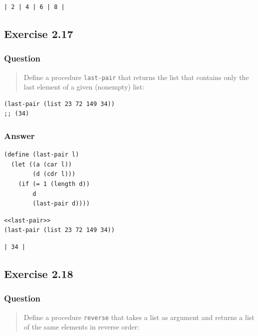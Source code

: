 \documentclass[final,fleqn,titlepage,twoside]{article}
\begin{document}
\begin{verbatim}
| 2 | 4 | 6 | 8 |
\end{verbatim}

\subsection{Exercise 2.17}
\label{sec:org093b910}
\subsubsection{Question}
\label{sec:org63b839a}
\begin{quote}
Define a procedure
\texttt{last-pair} that returns the list that contains only the last element of a
given (nonempty) list:
\end{quote}

\begin{verbatim}
(last-pair (list 23 72 149 34))
;; (34)
\end{verbatim}

\subsubsection{Answer}
\label{sec:org8aef1be}
\begin{verbatim}
(define (last-pair l)
  (let ((a (car l))
        (d (cdr l)))
    (if (= 1 (length d))
        d
        (last-pair d))))
\end{verbatim}
\begin{verbatim}
<<last-pair>>
(last-pair (list 23 72 149 34))
\end{verbatim}

\begin{verbatim}
| 34 |
\end{verbatim}

\subsection{Exercise 2.18}
\label{sec:orge363a9f}
\subsubsection{Question}
\label{sec:org03bca6e}
\begin{quote}
Define a procedure \texttt{reverse} that takes a list as argument and returns
a list of the same elements in reverse order:
\end{quote}
\end{document}
